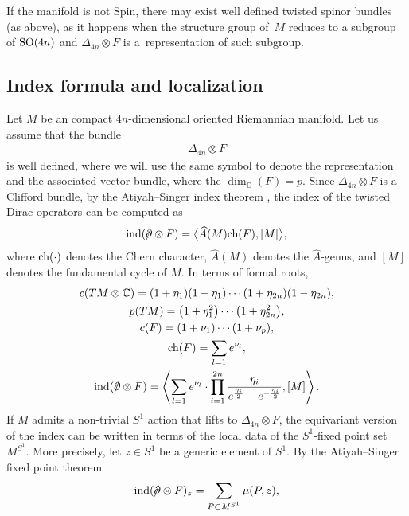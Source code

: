 \documentclass[pdftex]{sigma}
\newcommand{\A}{\mbox{$\widehat A$}}
\newcommand{\ind}{\mbox{\rm ind}}
\newcommand{\ch}{\mbox{\rm ch}}
\newcommand{\dirac}{/\kern-5pt\partial}
\numberwithin{equation}{section}
\begin{document}
\begin{Remark}
If the manifold is not Spin, there may exist well def\/ined twisted spinor bundles (as above), as it happens when the structure group of~$M$ reduces to a subgroup of ${\rm SO}(4n)$ and $\Delta_{4n}\otimes F$ is a~representation of such subgroup.
\end{Remark}

\subsection{Index formula and localization}\label{subsec: localization}

Let $M$ be an compact $4n$-dimensional oriented Riemannian manifold. Let us assume that the bundle
\begin{gather*}\Delta_{4n}\otimes F\end{gather*}
is well def\/ined, where we will use the same symbol to denote the representation and the associated vector bundle, where the $\dim_{\mathbb{C}}(F)=p$. Since $\Delta_{4n}\otimes F$ is a Clif\/ford bundle, by the Atiyah--Singer index theorem \cite{Berline,Roe}, the index of the twisted Dirac operators can be computed as
\begin{gather*}\ind(\dirac\otimes F) = \big\langle \A(M) \ch(F),[M]\big\rangle,\end{gather*}
where $\ch(\cdot)$ denotes the Chern character, $\A(M)$ denotes the \A-genus, and $[M]$ denotes the fundamental cycle of $M$. In terms of formal roots,
\begin{gather*}
c(TM\otimes\mathbb{C})= (1+\eta_1)(1-\eta_1)\cdots (1+\eta_{2n})(1-\eta_{2n}),\\
 p(TM)= \big(1+\eta_1^2\big)\cdots \big(1+\eta_{2n}^2\big),\\
 c(F) = (1+\nu_1)\cdots (1+\nu_{p}),\\
 \ch(F)= \sum_{l=1} e^{\nu_l}, \\
 \ind(\dirac\otimes F) = \left\langle \sum_{l=1} e^{\nu_l} \cdot \prod_{i=1}^{2n}
{ \eta_i \over e^{\eta_i\over2}-e^{-{\eta_i\over2}}},[M]\right\rangle .
\end{gather*}
If $M$ admits a non-trivial $S^1$ action that lifts to $\Delta_{4n}\otimes F$, the equivariant version of the index can be written in terms of the local data of the $S^1$-f\/ixed point set~$M^{S^1}$. More precisely, let $z\in S^1$ be a generic element of $S^1$. By the Atiyah--Singer f\/ixed point theorem~\cite{AS3,Berline}
\begin{gather*}\ind(\dirac\otimes F)_{z}= \sum_{P\subset M^{S^1}} \mu(P,z),\end{gather*}
\end{document}
